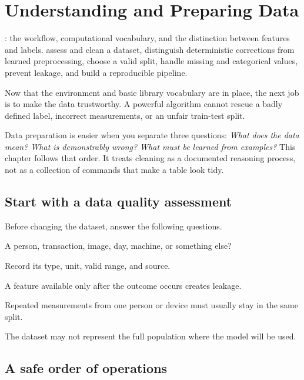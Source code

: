 \chapter{Understanding and Preparing Data}
\label{ch:data}

\chapterguide%
  {: the workflow, computational vocabulary, and the distinction between features and labels.}
  {assess and clean a dataset, distinguish deterministic corrections from learned preprocessing, choose a valid split, handle missing and categorical values, prevent leakage, and build a reproducible pipeline.}

Now that the environment and basic library vocabulary are in place, the next job is to make the data trustworthy. A powerful algorithm cannot rescue a badly defined label, incorrect measurements, or an unfair train-test split.

Data preparation is easier when you separate three questions: \emph{What does the data mean? What is demonstrably wrong? What must be learned from examples?} This chapter follows that order. It treats cleaning as a documented reasoning process, not as a collection of commands that make a table look tidy.

\section{Start with a data quality assessment}

Before changing the dataset, answer the following questions.

\begin{mlsteps}
  \item {} A person, transaction, image, day, machine, or something else?
  \item {} Record its type, unit, valid range, and source.
  \item {} A feature available only after the outcome occurs creates leakage.
  \item {} Repeated measurements from one person or device must usually stay in the same split.
  \item {} The dataset may not represent the full population where the model will be used.
\end{mlsteps}

\section{A safe order of operations}

